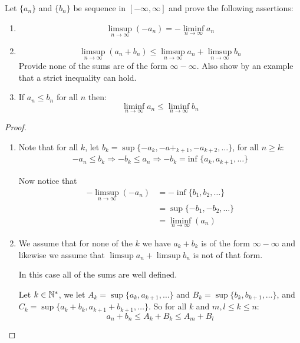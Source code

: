     \begin{exercise}
        Let $\{a_n\}$ and $\{b_n\}$ be sequence in $[-\infty,\infty]$ and prove the following assertions:\begin{enumerate}[label = (\alph*)]
            \item \[\limsup_{n\rightarrow\infty}(-a_n) = -\liminf_{n\rightarrow\infty}a_n\]
            \item \[\limsup_{n\rightarrow\infty}(a_n+b_n) \leq \limsup_{n\rightarrow \infty}a_n + \limsup_{n\rightarrow\infty}b_n\] Provide none of the sums are of the form $\infty-\infty$. Also show by an example that a strict inequality can hold.
            \item If $a_n\leq b_n$ for all $n$ then:\[\liminf_{n\rightarrow\infty}a_n\leq \liminf_{n\rightarrow\infty}b_n\]
        \end{enumerate}

        \begin{proof}
            \begin{enumerate}[label = (\alph*)]
                \item Note that for all $k$, let $b_k = \sup\{-a_k, -a+_{k+1},-a_{k+2},\ldots\}$, for all $n\geq k$: \begin{align*}
                    -a_n\leq b_k \Rightarrow -b_k\leq a_n \Rightarrow -b_k = \text{inf }\{a_k,a_{k+1},\ldots\}
                \end{align*}

                Now notice that \begin{align*}
                   -\limsup_{n\rightarrow\infty}(-a_n)   &=-\inf\{b_1,b_2,\ldots\}\\
                      &= \sup\{-b_1,-b_2,\ldots\}\\
                      &= \liminf_{n\rightarrow \infty}(a_n)
                \end{align*}

                \item We assume that for none of the $k$ we have $a_k+b_k$ is of the form $\infty-\infty$ and likewise we assume that $\limsup a_n + \limsup b_n$ is not of that form.
                
                In this case all of the sums are well defined. 
                
                Let $k\in \mathbb{N}^\ast$, we let $A_k = \sup\{a_k,a_{k+1},\ldots\}$ and $B_k = \sup\{b_k,b_{k+1},\ldots\}$, and $C_k = \sup\{a_k+b_k, a_{k+1}+b_{k+1},\ldots\}$. So for all $k$ and $m,l\leq k\leq n$:\begin{equation*}
                    a_n+b_n \leq A_k+B_k\leq A_m+B_l
                \end{equation*}


\end{enumerate}
\end{proof}
\end{exercise}
